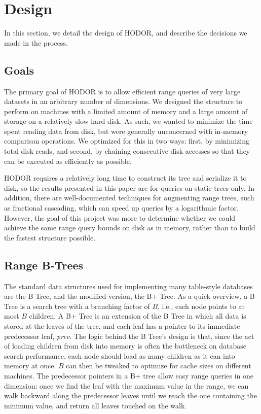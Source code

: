\documentclass[11pt, oneside]{article}
\newcommand{\ms}{\textit}
\begin{document}
\section{Design}

In this section, we detail the design of HODOR, and describe the decisions we
made in the process.

\subsection{Goals}

The primary goal of HODOR is to allow efficient range queries of very large
datasets in an arbitrary number of dimensions. We designed the structure to
perform on machines with a limited amount of memory and a large amount of
storage on a relatively slow hard disk. As such, we wanted to minimize the
time spent reading data from disk, but were generally unconcerned with
in-memory comparison operations. We optimized for this in two ways: first, by
minimizing total disk reads, and second, by chaining consecutive disk accesses
so that they can be executed as efficiently as possible. 

HODOR requires a relatively long time to construct its tree and serialize it to
disk, so the results presented in this paper are for queries on static trees
only. In addition, there are well-documented techniques for augmenting range
trees, such as fractional cascading, which can speed up queries by a logarithmic
factor. However, the goal of this project was more to determine whether we could
achieve the same range query bounds on disk as in memory, rather than to build
the fastest structure possible.

\subsection{Range B-Trees}

The standard data structures used for implementing many table-style databases
are the B Tree, and the modified version, the B+ Tree. As a quick overview, a B Tree is a
search tree with a branching factor of $B$, i.e., each node points to at most
$B$ children. A B+ Tree is an extension of the B Tree in which all data is stored at the
leaves of the tree, and each leaf has a pointer to its immediate predecessor
leaf, \ms{prev}. The logic behind the B Tree's design is that, since the act of
loading children from disk into memory is often the bottleneck on database
search performance, each node should load as many children as it can into memory
at once. $B$ can then be tweaked to optimize for cache sizes on different machines.
The predecessor pointers in a B+ tree allow easy range queries in one
dimension: once we find the leaf with the maximum value in the range, we can
walk backward along the predecessor leaves until we reach the one containing the
minimum value, and return all leaves touched on the walk.
\end{document}

